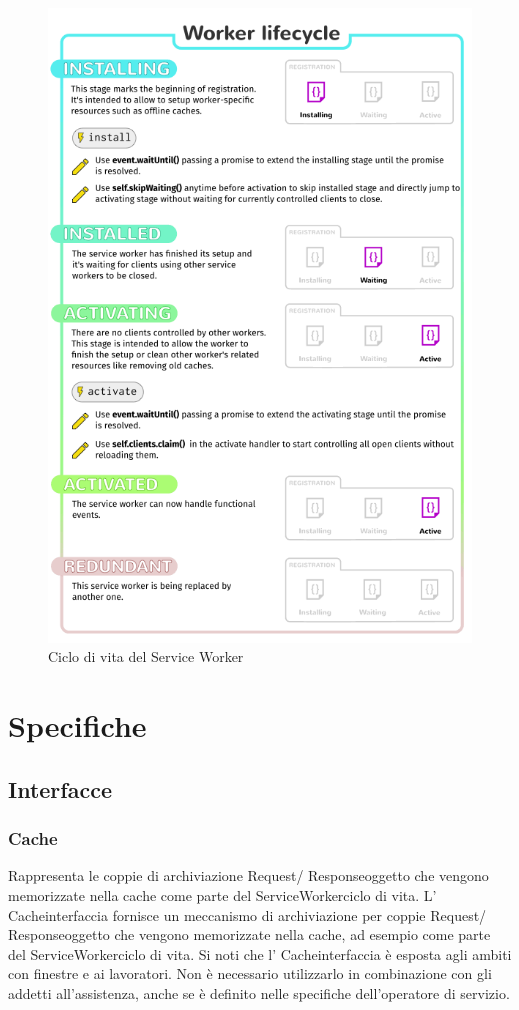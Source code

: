 \documentclass[italian]{article}
\begin{document}
\begin{figure}
	\centering
	\includegraphics[width=1\linewidth]{SwLifecycle}
	\caption{Ciclo di vita del Service Worker}
	\label{fig:Ciclo di vita del Service Worker}
\end{figure}

\newpage
\section{Specifiche}
\subsection{Interfacce}
\subsubsection{Cache}
Rappresenta le coppie di archiviazione Request/ Responseoggetto che vengono memorizzate nella cache come parte del ServiceWorkerciclo di vita.
L' Cacheinterfaccia fornisce un meccanismo di archiviazione per coppie Request/ Responseoggetto che vengono memorizzate nella cache, ad esempio come parte del ServiceWorkerciclo di vita. Si noti che l' Cacheinterfaccia è esposta agli ambiti con finestre e ai lavoratori. Non è necessario utilizzarlo in combinazione con gli addetti all'assistenza, anche se è definito nelle specifiche dell'operatore di servizio.
\end{document}
